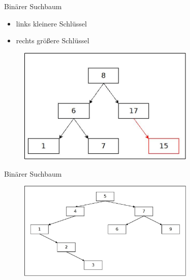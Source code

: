\documentclass[11pt]{beamer}
\begin{document}
		\begin{frame} {Binärer Suchbaum}
			\begin{multicols}{2}
				\begin{itemize}
					\item links kleinere Schlüssel
					\item rechts größere Schlüssel
				\end{itemize}
			\end{multicols}
			\begin{figure}[h]
				\centering
				\includegraphics[width=0.75\textwidth]{"bilder/suchbaumNIO"}
			\end{figure}  
		\end{frame}
		
		\begin{frame}{Binärer Suchbaum}
		
			
			 \begin{figure}[h]
				\centering
				\includegraphics[width=0.75\textwidth]{"bilder/binSuchSuchpfad"}
				\label{fig:SuchbaumEinfügen}
			\end{figure}
		\end{frame}
		
\end{document}
